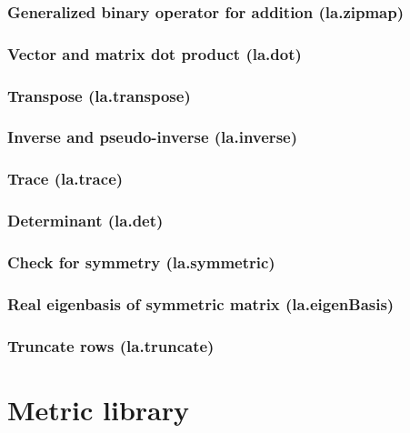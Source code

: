 \documentclass{article}
\theoremstyle{definition}
\begin{document}
\subsubsection{Generalized binary operator for addition (la.zipmap)}

\subsubsection{Vector and matrix dot product (la.dot)}

\subsubsection{Transpose (la.transpose)}

\subsubsection{Inverse and pseudo-inverse (la.inverse)}

\subsubsection{Trace (la.trace)}

\subsubsection{Determinant (la.det)}

\subsubsection{Check for symmetry (la.symmetric)}

\subsubsection{Real eigenbasis of symmetric matrix (la.eigenBasis)}

\subsubsection{Truncate rows (la.truncate)}

\pagebreak

\section{Metric library}
\end{document}

